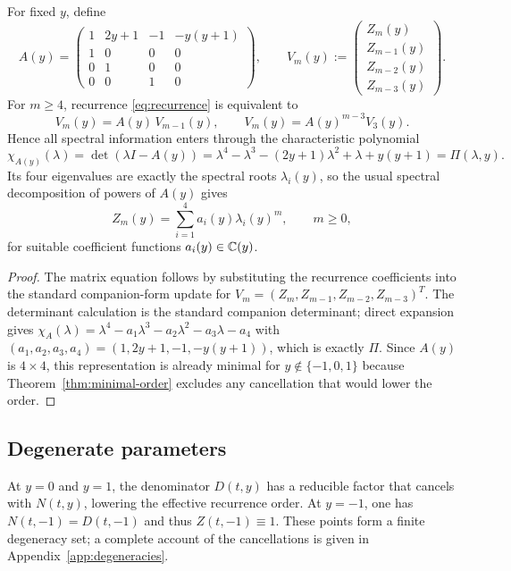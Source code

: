 \begin{proposition}\label{prop:transfer-matrix}
For fixed $y$, define
\[
A(y)=
\begin{pmatrix}
1&2y+1&-1&-y(y+1)\\
1&0&0&0\\
0&1&0&0\\
0&0&1&0
\end{pmatrix},\qquad
V_m(y):=
\begin{pmatrix}
Z_m(y)\\
Z_{m-1}(y)\\
Z_{m-2}(y)\\
Z_{m-3}(y)
\end{pmatrix}.
\]
For $m\ge 4$, recurrence \eqref{eq:recurrence} is equivalent to
\[
V_m(y)=A(y)\,V_{m-1}(y),
\qquad
V_m(y)=A(y)^{m-3}V_3(y).
\]
Hence all spectral information enters through the characteristic polynomial
\[
\chi_{A(y)}(\lambda)=\det(\lambda I-A(y))
=\lambda^4-\lambda^3-(2y+1)\lambda^2+\lambda+y(y+1)=\Pi(\lambda,y).
\]
Its four eigenvalues are exactly the spectral roots $\lambda_i(y)$, so the usual spectral decomposition of powers of $A(y)$ gives
\[
Z_m(y)=\sum_{i=1}^4 a_i(y)\lambda_i(y)^m,\qquad m\ge 0,
\]
for suitable coefficient functions $a_i(y)\in\mathbb{C}(y)$.
\end{proposition}

\begin{proof}
The matrix equation follows by substituting the recurrence coefficients into the standard companion-form update for
\(
V_m=(Z_m,Z_{m-1},Z_{m-2},Z_{m-3})^T.
\)
The determinant calculation is the standard companion determinant; direct expansion gives
\(
\chi_{A}( \lambda)=\lambda^4-a_1\lambda^3-a_2\lambda^2-a_3\lambda-a_4
\)
with $(a_1,a_2,a_3,a_4)=(1,2y+1,-1,-y(y+1))$, which is exactly $\Pi$.
Since $A(y)$ is $4\times4$, this representation is already minimal for $y\notin\{-1,0,1\}$ because Theorem~\ref{thm:minimal-order} excludes any cancellation that would lower the order.
\end{proof}

\subsection{Degenerate parameters}

At $y=0$ and $y=1$, the denominator $D(t,y)$ has a reducible factor that cancels with $N(t,y)$, lowering the effective recurrence order.
At $y=-1$, one has $N(t,-1)=D(t,-1)$ and thus $Z(t,-1)\equiv 1$.
These points form a finite degeneracy set; a complete account of the cancellations is given in Appendix~\ref{app:degeneracies}.

